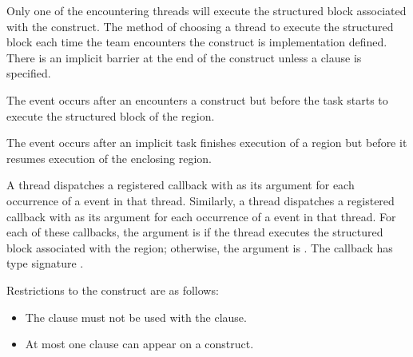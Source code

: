 \descr
Only one of the encountering threads will execute the structured block 
associated with the  construct. The method of choosing a thread 
to execute the structured block each time the team encounters the construct
is implementation defined. There is an implicit barrier at the end of the 
 construct unless a  clause is specified.

\events

The  event occurs after an  encounters a
 construct but before the task starts to execute the structured
block of the  region.

The  event occurs after an implicit task finishes execution of 
a  region but before it resumes execution of the enclosing region.

\tools

A thread dispatches a registered  callback with 
 as its  argument for each 
occurrence of a  event  in that thread. Similarly, a 
thread dispatches a registered  callback  with 
 as its  argument for each occurrence 
of a  event in that thread. For each of these callbacks,
the  argument is  if the thread
executes the structured block associated with the  region;
otherwise, the  argument is  .
The callback has type signature .

\restrictions
Restrictions to the  construct are as follows:

\begin{itemize}
\item The  clause must not be used with the  clause.
\item At most one  clause can appear on a  construct.

\end{itemize}


